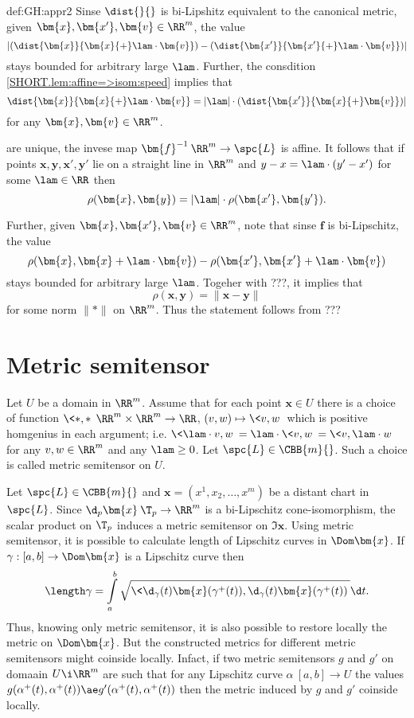 {\begin{subthm}{def:GH:appr2}
Sinse $\dist{}{}$ is bi-Lipshitz equivalent to the canonical metric, given $\bm{x},\bm{x'}, \bm{v}\in\RR^m$, the value 
$$|(\dist{\bm{x}}{\bm{x}{+}\lam\cdot\bm{v}})-(\dist{\bm{x'}}{\bm{x'}{+}\lam\cdot\bm{v}})|$$
stays bounded for arbitrary large $\lam$.
Further, the consdition \ref{SHORT.lem:affine=>isom:speed} implies that
$$\dist{\bm{x}}{\bm{x}{+}\lam\cdot\bm{v}}
=
|\lam|\cdot(\dist{\bm{x'}}{\bm{x}{+}\bm{v}})|$$
for any $\bm{x},\bm{v}\in\RR^m$.



 are unique, the invese map $\bm{f}^{-1}\:\RR^m\to\spc{L}$ is affine.
It follows that if points $\bm{x},\bm{y},\bm{x'},\bm{y'}$ lie on a straight line in $\RR^m$ and $y-x=\lam\cdot(y'-x')$ for some $\lam\in\RR$ then
$$\rho(\bm{x},\bm{y})=|\lam|\cdot\rho(\bm{x'},\bm{y'}).$$

Further, 
given $\bm{x},\bm{x'}, \bm{v}\in\RR^m$,
note that sinse $\bm{f}$ is bi-Lipschitz, the value 
$$\rho(\bm{x},\bm{x}+\lam\cdot\bm{v})-\rho(\bm{x'},\bm{x'}+\lam\cdot\bm{v})$$
stays bounded for arbitrary large $\lam$.
Togeher with ???, it implies that 
$$\rho(\bm{x},\bm{y})=\|\bm{x}-\bm{y}\|$$
for some norm $\|{*}\|$ on $\RR^m$.
Thus the statement follows from ???
\qeds















\section{Metric semitensor}

Let $U$ be a domain in $\RR^m$.
Assume that for each point $\bm{x}\in U$ there is a choice of function $\<{*},{*}\>\:\RR^m\times\RR^m\to \RR$, $(v,w)\mapsto\<v,w\>$ which is positive homgenius in each argument; i.e. $\<\lam\cdot v, w\>=\lam\cdot\<v,w\>=\<v,\lam\cdot w\>$ for any $v,w\in \RR^m$ and any $\lam\ge0$.
Let $\spc{L}\in\CBB{m}{}$.
Such a choice is called metric semitensor on $U$.

Let $\spc{L}\in\CBB{m}{}$ and $\bm{x}=(x^1,x_2,\dots,x^m)$ be a distant chart in $\spc{L}$.
Since $\d_p\bm{x}\:\T_p\to\RR^m$ is a bi-Lipschitz cone-isomorphism,
the scalar product on $\T_p$ induces a metric semitensor on $\Im\bm{x}$.
Using metric semitensor, it is possible to calculate length of Lipschitz curves in $\Dom \bm{x}$.
If $\gamma:[a,b]\to\Dom \bm{x}$ is a Lipschitz curve then 
$$\length\gamma
=
\int\limits_a^b
\sqrt{\<\d_\gamma(t)\bm{x}(\gamma^+(t)),\d_\gamma(t)\bm{x}(\gamma^+(t))\>}\d t.$$
Thus, knowing only metric semitensor, 
it is also possible to restore locally the metric on $\Dom \bm{x}$.
But the constructed metrics for different metric semitensors might coinside locally.
Infact, if two metric semitensors $g$ and $g'$ on domaain $U\i\RR^m$ are such that for any Lipschitz curve $\alpha\:[a,b]\to U$ the values 
$g(\alpha^+(t),\alpha^+(t))
\ae 
g'(\alpha^+(t),\alpha^+(t))$ then the metric induced by $g$ and $g'$ coinside locally.









\end{subthm}}
